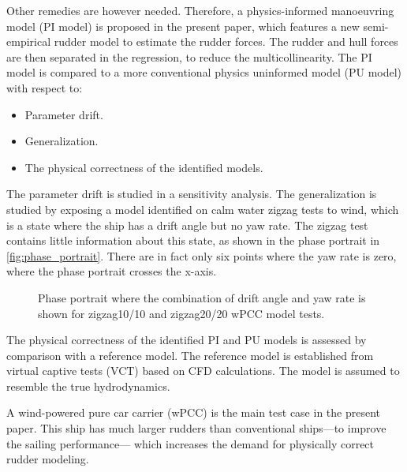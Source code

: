 Other remedies are however needed. Therefore, a physics-informed manoeuvring model (PI model) is proposed in the present paper, which features a new semi-empirical rudder model to estimate the rudder forces. The rudder and hull forces are then separated in the regression, to reduce the multicollinearity. The PI model is compared to a more conventional physics uninformed model (PU model) with respect to: 
\begin{itemize}
    \item Parameter drift.
    \item Generalization.
    \item The physical correctness of the identified models.
\end{itemize}
The parameter drift is studied in a sensitivity analysis. The generalization is studied by exposing a model identified on calm water zigzag tests to wind, which is a state where the ship has a drift angle but no yaw rate. The zigzag test contains little information about this state, as shown in the phase portrait in \autoref{fig:phase_portrait}. There are in fact only six points where the yaw rate is zero, where the phase portrait crosses the x-axis. 
\begin{figure}[h]
  \centering
  
  \caption{Phase portrait where the combination of drift angle and yaw rate is shown for zigzag10/10 and zigzag20/20 wPCC model tests.}
  \label{fig:phase_portrait}
\end{figure}

The physical correctness of the identified PI and PU models is assessed by comparison with a reference model. The reference model is established from virtual captive tests (VCT) based on CFD calculations. The model is assumed to resemble the true hydrodynamics.  

A wind-powered pure car carrier (wPCC) is the main test case in the present paper. 
This ship has much larger rudders than conventional ships---to improve the sailing performance---
which increases the demand for physically correct rudder modeling.

